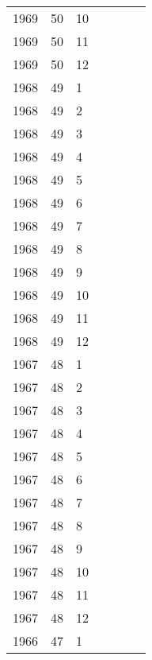 \begin{longtable}{ |l|l|l|l|p{2.7cm}|l|p{2cm}| }
 1969 & 50 &    10 &         &                &  & \\
 1969 & 50 &    11 &         &                &  & \\
 1969 & 50 &    12 &         &                &  & \\
 1968 & 49 &     1 &         &                &  & \\
 1968 & 49 &     2 &         &                &  & \\
 1968 & 49 &     3 &         &                &  & \\
 1968 & 49 &     4 &         &                &  & \\
 1968 & 49 &     5 &         &                &  & \\
 1968 & 49 &     6 &         &                &  & \\
 1968 & 49 &     7 &         &                &  & \\
 1968 & 49 &     8 &         &                &  & \\
 1968 & 49 &     9 &         &                &  & \\
 1968 & 49 &    10 &         &                &  & \\
 1968 & 49 &    11 &         &                &  & \\
 1968 & 49 &    12 &         &                &  & \\
 1967 & 48 &     1 &         &                &  & \\
 1967 & 48 &     2 &         &                &  & \\
 1967 & 48 &     3 &         &                &  & \\
 1967 & 48 &     4 &         &                &  & \\
 1967 & 48 &     5 &         &                &  & \\
 1967 & 48 &     6 &         &                &  & \\
 1967 & 48 &     7 &         &                &  & \\
 1967 & 48 &     8 &         &                &  & \\
 1967 & 48 &     9 &         &                &  & \\
 1967 & 48 &    10 &         &                &  & \\
 1967 & 48 &    11 &         &                &  & \\
 1967 & 48 &    12 &         &                &  & \\
 1966 & 47 &     1 &         &                &  & \\

\end{longtable}
